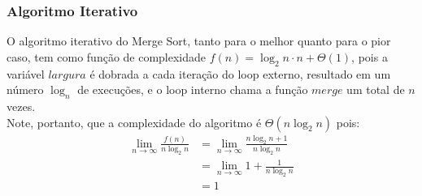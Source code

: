 \subsubsection{Algoritmo Iterativo}
O algoritmo iterativo do Merge Sort, tanto para o melhor quanto para o pior caso, tem como função de complexidade $f(n) = \log_2 n \cdot n + \Theta(1)$, pois a variável $largura$ é dobrada a cada iteração do loop externo, resultado em um número $\log_n$ de execuções, e o loop interno chama a função $merge$ um total de $n$ vezes. \\
Note, portanto, que a complexidade do algoritmo é $\Theta(n \log_2 n)$ pois:
\begin{align*}
  \lim_{n\to\infty} \frac{f(n)}{n\log_2 n} &= \lim_{n\to\infty} \frac{n \log_2 n + 1}{n\log_2 n} \\
  &= \lim_{n\to\infty} 1 + \frac{1}{n \log_2 n} \\
  &= 1
\end{align*}
